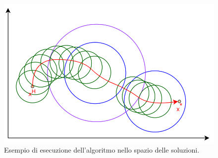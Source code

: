 \begin{figure}[h] 
\begin{center} 
  \includegraphics[scale=0.38]{Images/local_exe}
  \caption{\footnotesize{Esempio di esecuzione dell'algoritmo nello spazio delle soluzioni.}} \label{local_exe} 
\end{center} 
\end{figure}
